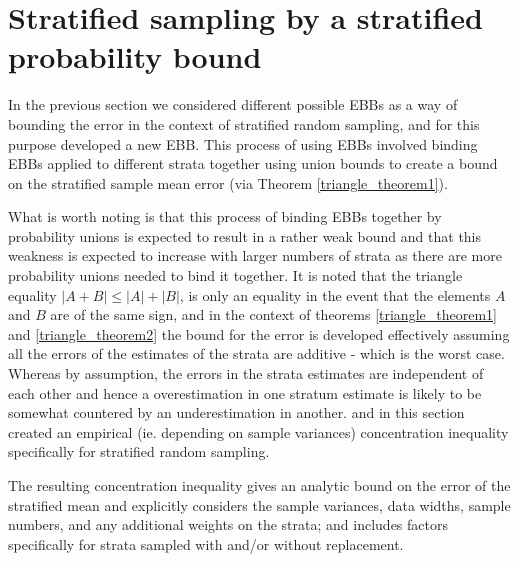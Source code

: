 

\section{Stratified sampling by a stratified probability bound}\label{section:SEBB}

In the previous section we considered different possible EBBs as a way of bounding the error in the context of stratified random sampling, and for this purpose developed a new EBB.
This process of using EBBs involved binding EBBs applied to different strata together using union bounds to create a bound on the stratified sample mean error (via \DIFdelbegin {}\DIFdelend Theorem \ref{triangle_theorem1}).

What is worth noting is that this process of binding EBBs together by probability unions is expected to result in a rather weak bound and that this weakness is expected to increase with larger numbers of strata as there are more probability unions needed to bind it together.
It is noted that the triangle equality $|A+B|\le |A|+|B|$, is only an equality in the event that the elements $A$ and $B$ are of the same sign, and in the context of theorems \ref{triangle_theorem1} and \ref{triangle_theorem2} the bound for the error is developed \DIFaddbegin {}\DIFaddend effectively assuming all the errors of the estimates of the strata are additive - which is \DIFdelbegin {}\DIFdelend the worst case.
Whereas by assumption, the errors in the strata estimates are independent of each other and hence a overestimation in one stratum estimate is likely to be somewhat countered by an underestimation in another.
\DIFdelbegin {}\DIFdelend \DIFaddbegin {}\DIFaddend and in this section \DIFdelbegin {}\DIFdelend \DIFaddbegin {}\DIFaddend created an empirical (ie. depending on sample variances) concentration inequality specifically for stratified random sampling\DIFdelbegin {}\DIFdelend .

The resulting concentration inequality gives an analytic bound on the error of the stratified mean and explicitly considers the sample variances, data widths, sample numbers, and any additional weights on the strata; and includes factors specifically for strata sampled with and/or without replacement.

